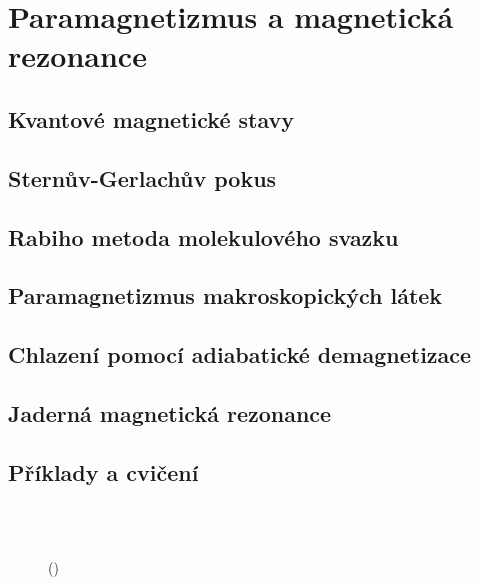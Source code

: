\setchaptertoc
\chapter{Paramagnetizmus a magnetická rezonance}\label{fyz:IIchapXXXV}

  \section{Kvantové magnetické stavy}\label{fyz:IIchapXXXVsecI}
  \section{Sternův-Gerlachův pokus}\label{fyz:IIchapXXXVsecII}
  \section{Rabiho metoda molekulového svazku}\label{fyz:IIchapXXXVsecIII}
  \section{Paramagnetizmus makroskopických látek}\label{fyz:IIchapXXXVsecIV}
  \section{Chlazení pomocí adiabatické demagnetizace}\label{fyz:IIchapXXXVsecV}
  \section{Jaderná magnetická rezonance}\label{fyz:IIchapXXXVsecVI}
  \section{Příklady a cvičení}\label{fyz:IIchapXXXVsecVII}

    \begin{figure}[ht!] %
      \centering
                     \\
                     \\
      \caption{
               (\cite[s.~748]{Feynman02})}
      \label{fyz:fig846}
    \end{figure}

